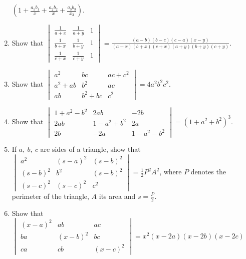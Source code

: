\begin{enumerate}[resume]
  $\left(1 + \frac{a_1b_1}{x} + \frac{a_2b_2}{x} + \frac{a_3b_3}{x_3}\right)$.
\item Show that $\begin{vmatrix}\frac{1}{a + x} & \frac{1}{a + y} & 1\\\frac{1}{b + x} & \frac{1}{b + y} & 1\\\frac{1}{c + x} &
  \frac{1}{c + y} & 1\end{vmatrix}  = \frac{(a - b)(b - c)(c - a)(x - y)}{(a + x)(b + x)(c + x)(a + y)(b + y)(c + y)}$.
\item Show that $\begin{vmatrix}a^2 & bc & ac + c^2\\a^2 + ab & b^2 & ac\\ab & b^2 + bc & c^2\end{vmatrix} = 4a^2b^2c^2$.
\item Show that $\begin{vmatrix}1 + a^2 - b^2 & 2ab & -2b\\2ab & 1 - a^2 + b^2 & 2a\\2b & -2a & 1 - a^2 - b^2\end{vmatrix} = (1 +
  a^2 + b^2)^3$.
\item If $a,\ b,\ c$ are sides of a triangle, show that $\begin{vmatrix}a^2 & (s - a)^2 & (s - b)^2\\(s - b)^2 & b^2 & (s -
  b)^2\\(s - c)^2 & (s - c)^2 & c^2\end{vmatrix} = \frac{1}{2}P^2A^2$, where $P$ denotes the perimeter of the triangle, $A$ its
  area and $s = \frac{P}{2}$.
\item Show that $\begin{vmatrix}(x - a)^2 & ab & ac\\ba & (x - b)^2 & bc\\ca & cb & (x - c)^2\end{vmatrix} = x^2(x - 2a)(x - 2b)(x
  - 2c)$


\end{enumerate}
